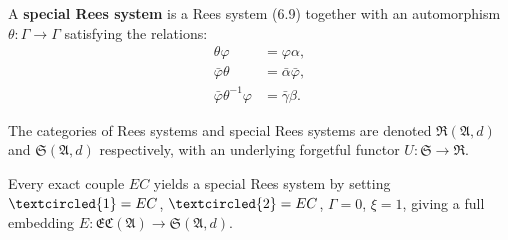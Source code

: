 A \textbf{special Rees system} is a Rees system (6.9) together with an automorphism $\theta : \Gamma \to \Gamma$ satisfying the relations:
\begin{align*}
\theta \varphi &= \varphi \alpha, \\
\bar{\varphi} \theta &= \bar{\alpha} \bar{\varphi}, \\
\bar{\varphi} \theta^{-1} \varphi &= \bar{\gamma} \beta.
\end{align*}

The categories of Rees systems and special Rees systems are denoted $\mathfrak{R}(\mathfrak{A}, d)$ and $\mathfrak{S}(\mathfrak{A}, d)$ respectively, with an underlying forgetful functor $U : \mathfrak{S} \to \mathfrak{R}$.

Every exact couple $EC$ yields a special Rees system by setting $\textcircled{1} = EC$, $\textcircled{2} = EC$, $\Gamma = 0$, $\xi = 1$, giving a full embedding $E : \mathfrak{EC}(\mathfrak{A}) \to \mathfrak{S}(\mathfrak{A}, d)$.
